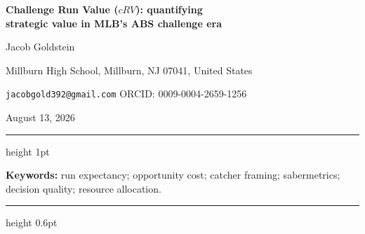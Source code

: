\documentclass[11pt]{article}
\begin{document}
\begin{center}
  {\color{crvblue}\LARGE\bfseries Challenge Run Value ($cRV$): quantifying\\[0.4em]
   strategic value in MLB's ABS challenge era\par}
  \vspace{1.4em}
  {\Large Jacob Goldstein\par}
  \vspace{0.5em}
  {\large Millburn High School, Millburn, NJ 07041, United States\par}
  \vspace{0.6em}
  {\small \texttt{jacobgold392@gmail.com} \quad\textbullet\quad ORCID: 0009-0004-2659-1256\par}
  \vspace{1.2em}
  {\normalsize August 13, 2026\par}
  \vspace{1.4em}
  {\color{crvblue}\hrule height 1pt}
\end{center}

\vspace{1.2em}

\par
\vspace{0.5em}
\noindent


\vspace{1.2em}
\noindent\textbf{Keywords:} run expectancy; opportunity cost; catcher framing;
sabermetrics; decision quality; resource allocation.

\vspace{0.6em}
{\color{crvblue}\hrule height 0.6pt}







\end{document}
